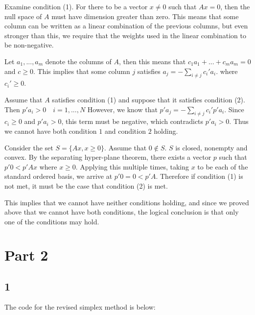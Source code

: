 \documentclass[12pt]{paper}
\begin{document}
\vspace{.3in}

Examine condition (1). For there to be a vector $x \neq 0$ such that $Ax
=0$, then the null space of $A$ must have dimension greater than
zero. This means that some column can be written as a linear
combination of the previous columns, but even stronger than this, we
require that the weights used in the linear combination to be
non-negative.

Let $a_1,...,a_m$ denote the columns of $A$, then this means that $c_1
a_1 + ... + c_m a_m = 0$ and $c \geq 0$. This implies that some column
$j$ satisfies $a_j = - \sum_{i \neq j} c_i' a_i$. where $c_i' \geq 0$.

Assume that $A$ satisfies condition (1) and suppose that it satisfies
condition (2). Then $p'a_i > 0 \quad i = 1,...,N$ However, we know that
$p'a_j = - \sum_{i \neq j}c_i' p'a_i$. Since $c_i \geq 0$ and $p'a_i > 0$, this
term must be negative, which contradicts $p'a_i > 0$. Thus we cannot
have both condition $1$ and condition $2$ holding.

Consider the set $S = \{ Ax, x \geq 0 \}$. Assume that $0 \notin S$.
$S$ is closed, nonempty and convex. By the separating hyper-plane
theorem, there exists a vector $p$ such that $p'0 < p'Ax$ where
$x \geq 0$. Applying this multiple times, taking $x$ to be each of the
standard ordered basis, we arrive at $p'0 = 0 < p'A$. Therefore if
condition (1) is not met, it must be the case that condition (2) is
met.

This implies that we cannot have neither conditions holding, and since
we proved above that we cannot have both conditions, the logical
conclusion is that only one of the conditions may hold.


\section{ Part 2}

\subsection{1}

The code for the revised simplex method is below:
\end{document}
